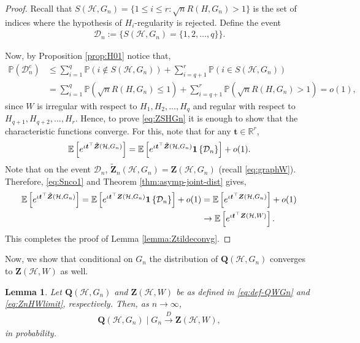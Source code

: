 \documentclass[11pt,reqno]{amsart}
\numberwithin{equation}{section}
\newcommand{\one}{{\bf 1}}
\newcommand{\R}{{\mathbb R}}
\newcommand{\E}{\mathbb{E}}
\newcommand{\cH}{{\mathcal H}}
\newcommand{\ra}{\rightarrow}
\newcommand\dto{\overset{D}{\rightarrow}}
\newtheorem{lemma}{Lemma}[section]
\theoremstyle{definition}
\begin{document}
\begin{proof}
Recall that $S(\cH, G_n) = \{ 1 \leq i \leq r: \sqrt n R(H,G_{n})  > 1 \} $ is the set of indices where the hypothesis of $H_i$-regularity is rejected. 
Define the event 
\begin{align}\label{eq:defcSn}
    \mathcal{D}_{n} := \{S(\cH, G_n) = \{1, 2, \ldots, q\} \} . 
\end{align}

Now, by Proposition \ref{prop:H01} notice that,
\begin{align}\label{eq:Snco1}
    \mathbb P(\mathcal D_n^c) 
    &\leq \sum_{i=1}^{q}\mathbb P\left(i\not\in S(\cH,G_n)\right) + \sum_{i=q+1}^{r}\mathbb P\left(i\in S(\cH,G_n)\right)\nonumber\\
    & = \sum_{i=1}^{q}\mathbb P\left(\sqrt{n}R(H,G_{n})\leq 1\right) + \sum_{i=q+1}^{r}\mathbb P\left(\sqrt{n}R(H,G_{n})> 1\right) = o(1) , 
\end{align}
since $W$ is irregular with respect to $H_{1}, H_{2}, \ldots, H_{q}$ and regular with respect to $H_{q+1}, H_{q+2}, \ldots, H_{r}$. Hence, to prove \eqref{eq:ZSHGn} it is enough to show that the characteristic functions converge. For this, note that for any $\bm t\in \R^r$,
\begin{align*}
    \E\left[ e^{\iota \bm t^{\top}\tilde{\bm Z}(\cH, G_n) } \right] = \E\left[ e^{\iota \bm t^{\top}\tilde{\bm Z}(\cH, G_n)} \one\left\{\mathcal{D}_n\right\}\right] + o(1) . 
\end{align*}
Note that on the event $\mathcal{D}_n$, $\tilde{\bm Z}_n(\cH,G_n) = \bm Z(\cH, G_n)$ (recall \eqref{eq:graphW}). Therefore, \eqref{eq:Snco1} and Theorem \ref{thm:asymp-joint-dist} gives,
\begin{align*}
    \E\left[ e^{\iota \bm t^{\top}\tilde{\bm Z}(\cH, G_n)} \right] 
     = \E\left[ e^{\iota \bm t^{\top}\bm Z(\cH, G_n)}\one\left\{\mathcal{D}_n\right\}\right] + o(1) 
    & = \E\left[ e^{\iota \bm t^{\top}\bm Z(\cH, G_n) } \right] + o(1) \\ 
    & \rightarrow \E\left[ e^{\iota \bm t^{\top}\bm Z(\cH, W) } \right] . 
\end{align*} 
This completes the proof of Lemma \ref{lemma:Ztildeconvg}.

\end{proof}

Now, we show that conditional on $G_n$ the distribution of $\bm Q(\cH, G_n)$ converges to $\bm Z(\cH, W)$ as well.


\begin{lemma}\label{lemma:convgQ}
    Let $\bm Q(\cH, G_n)$ and $\bm Z(\cH,W)$ be as defined in  \eqref{eq:def-QWGn} and \eqref{eq:ZnHWlimit}, respectively. Then, as $n\ra\infty$, 
    \begin{align*}
        \bm Q(\cH, G_n)\mid G_n\dto \bm Z(\cH,W) , 
    \end{align*}
    in probability.
\end{lemma}
\end{document}
